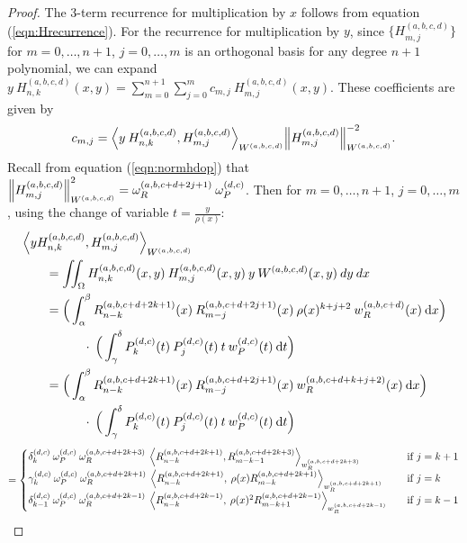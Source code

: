 \documentclass[11pt, oneside]{article}   	%
\newcommand{\hdop}{H}
\newcommand{\jac}{{P}}
\newcommand{\genjac}{R}
\newcommand{\genjacnmk}{\genjac_{n-k}}
\newcommand{\genjacmmj}{\genjac_{m-j}}
\newcommand{\genjacw}{w_\genjac}
\newcommand{\jacw}{w_P}
\newcommand{\normgenjac}{\omega_\genjac}
\newcommand{\normjac}{\omega_P}
\newcommand{\hdopnkabcd}{\hdop_{n,k}^{(a,b,c,d)}}
\newcommand{\Wabcd}{{W^{(a,b,c,d)}}}
\newcommand{\hdopmjabcd}{\hdop_{m,j}^{(a,b,c,d)}}
\begin{document}
\begin{proof}
The 3-term recurrence for multiplication by $x$ follows from equation (\ref{eqn:Hrecurrence}). For the recurrence for multiplication by $y$, since $\{\hdopmjabcd\}$ for $m = 0,\dots,n+1$, $j = 0,\dots,m$ is an orthogonal basis for any degree $n+1$ polynomial, we can expand $y \: \hdopnkabcd(x,y) = \sum_{m=0}^{n+1} \sum_{j=0}^m c_{m,j} \: \hdopmjabcd(x,y)$. These coefficients are given by
\begin{align*}
	c_{m,j} = {\ip< y \: \hdopnkabcd, \hdopmjabcd >_{\Wabcd}}{\norm{\hdopmjabcd}^{-2}_{\Wabcd}}.
\end{align*}
Recall from equation (\ref{eqn:normhdop}) that $\norm{\hdopmjabcd}_{\Wabcd}^2 = \normgenjac^{(a,b,c+d+2j+1)} \: \normjac^{(d,c)}$. Then for $m = 0,\dots,n+1$, $j = 0,\dots,m$, using the change of variable $t = \frac{y}{\rho(x)}$:
\begin{align*}
	&\ip<y \hdopnkabcd, \hdopmjabcd>_\Wabcd \\
	&\quad \quad =  \iint_\Omega \hdopnkabcd(x,y) \: \hdopmjabcd(x,y) \: y \: \Wabcd(x,y) \: dy \: dx \\
	&\quad \quad = \Big( \int^\beta_\alpha \genjacnmk^{(a, b, c+d+2k+1)}(x) \: \genjacmmj^{(a, b, c+d+2j+1)}(x) \: \rho(x)^{k+j+2} \: \genjacw^{(a, b,c+d)}(x) \: \D x \Big) \nonumber \\
	&\quad \quad \quad \quad \quad\cdot \: \Big( \int^\delta_{\gamma} \jac_k^{(d,c)}(t) \: \jac_j^{(d,c)}(t) \: t \: \jacw^{(d,c)}(t) \: \D t \Big) \\
	&\quad \quad = \Big( \int^\beta_\alpha \genjacnmk^{(a, b, c+d+2k+1)}(x) \: \genjacmmj^{(a, b, c+d+2j+1)}(x) \: \genjacw^{(a, b,c+d+k+j+2)}(x) \: \D x \Big) \nonumber \\
	&\quad \quad \quad \quad \quad\cdot \: \Big( \int^\delta_{\gamma} \jac_k^{(d,c)}(t) \: \jac_j^{(d,c)}(t) \: t \: \jacw^{(d,c)}(t) \: \D t \Big)
\end{align*}
\begin{align*}
	=
	\begin{cases}
    		\delta_k^{(d,c)} \: \normjac^{(d,c)} \: \normgenjac^{(a, b, c+d+2k+3)} \: \ip<\genjacnmk^{(a, b, c+d+2k+1)}, \genjac_{m-k-1}^{(a, b, c+d+2k+3)}>_{\genjacw^{(a, b, c+d+2k+3)}} \quad& \text{if } j = k+1 \\
		\gamma_k^{(d,c)} \: \normjac^{(d,c)} \: \normgenjac^{(a, b, c+d+2k+1)} \: \ip<\genjacnmk^{(a, b, c+d+2k+1)}, \: \rho(x) \genjac_{m-k}^{(a, b, c+d+2k+1)}>_{\genjacw^{(a, b, c+d+2k+1)}} \quad& \text{if } j = k \\
		\delta_{k-1}^{(d,c)} \: \normjac^{(d,c)} \: \normgenjac^{(a, b, c+d+2k-1)} \: \ip<\genjacnmk^{(a, b, c+d+2k-1)}, \: \rho(x)^2 \genjac_{m-k+1}^{(a, b, c+d+2k-1)}>_{\genjacw^{(a, b, c+d+2k-1)}} \quad& \text{if } j = k-1 \\

\end{cases}
\end{align*}
\end{proof}
\end{document}
